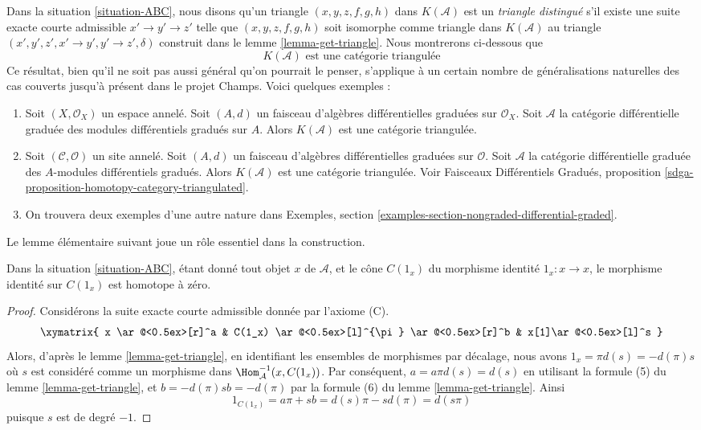 \noindent
Dans la situation \ref{situation-ABC}, nous disons qu'un
triangle $(x, y, z, f, g, h)$ dans
$K(\mathcal{A})$ est un {\it triangle distingué} s'il existe une suite
exacte courte admissible $x' \to y' \to z'$ telle que $(x,
y, z, f, g, h)$ soit isomorphe comme triangle dans $K(\mathcal{A})$ au
triangle $(x', y', z', x' \to y', y' \to z', \delta)$ construit
dans le lemme \ref{lemma-get-triangle}. Nous montrerons ci-dessous que
$$
\boxed{
K(\mathcal{A})\text{ est une catégorie triangulée}
}
$$
Ce résultat, bien qu'il ne soit pas aussi général qu'on pourrait le penser,
s'applique à un certain nombre de généralisations naturelles des cas couverts jusqu'à présent
dans le projet Champs. Voici quelques exemples :
\begin{enumerate}
\item Soit $(X, \mathcal{O}_X)$ un espace annelé. Soit $(A, d)$ un
faisceau d'algèbres différentielles graduées sur $\mathcal{O}_X$. Soit
$\mathcal{A}$ la catégorie différentielle graduée des modules
différentiels gradués sur $A$. Alors $K(\mathcal{A})$ est une catégorie triangulée.
\item Soit $(\mathcal{C}, \mathcal{O})$ un site annelé. Soit $(A, d)$ un
faisceau d'algèbres différentielles graduées sur $\mathcal{O}$.
Soit $\mathcal{A}$ la catégorie différentielle graduée des $A$-modules
différentiels gradués. Alors $K(\mathcal{A})$ est une catégorie triangulée.
Voir Faisceaux Différentiels Gradués, proposition
\ref{sdga-proposition-homotopy-category-triangulated}.
\item On trouvera deux exemples d'une autre nature dans Exemples, section
\ref{examples-section-nongraded-differential-graded}.
\end{enumerate}

\noindent
Le lemme élémentaire suivant joue un rôle essentiel dans la construction.

\begin{lemma}
\label{lemma-id-cone-null}
Dans la situation
\ref{situation-ABC}, étant donné tout objet $x$ de $\mathcal{A}$, et le cône $C(1_x)$
du morphisme identité $1_x : x \to x$, le morphisme identité sur
$C(1_x)$ est homotope à zéro.
\end{lemma}

\begin{proof}
Considérons la suite exacte courte admissible donnée par l'axiome (C).
$$
\xymatrix{
x \ar@<0.5ex>[r]^a &
C(1_x) \ar@<0.5ex>[l]^{\pi} \ar@<0.5ex>[r]^b &
x[1]\ar@<0.5ex>[l]^s
}
$$
Alors, d'après le lemme \ref{lemma-get-triangle}, en identifiant les ensembles
de morphismes par décalage, nous avons $1_x=\pi d(s)=-d(\pi)s$ où $s$ est
considéré comme un morphisme dans $\Hom_{\mathcal{A}}^{-1}(x,C(1_x))$. Par
conséquent, $a=a\pi d(s)=d(s)$ en utilisant la formule (5) du lemme
\ref{lemma-get-triangle}, et $b=-d(\pi)sb=-d(\pi)$ par la formule (6) du lemme \ref{lemma-get-triangle}.
Ainsi
$$
1_{C(1_x)} = a\pi + sb = d(s)\pi - sd(\pi) = d(s\pi)
$$
puisque $s$ est de degré $-1$.
\end{proof}

